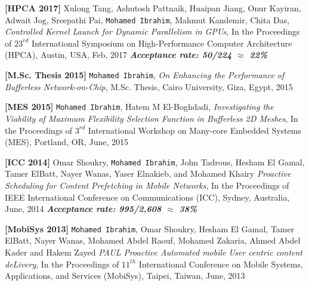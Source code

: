\documentclass[10pt,a4]{article}
\begin{document}

\begin{description}
\item 
{\bf [HPCA 2017]}
Xulong Tang, Ashutosh Pattnaik, Huaipan Jiang, Onur Kayiran, Adwait Jog, Sreepathi Pai, {\tt Mohamed Ibrahim}, Mahmut Kandemir, Chita Das, 
{\it Controlled Kernel Launch for Dynamic Parallelism in GPUs},
In the Proceedings of $23^{rd}$ International Symposium on High-Performance Computer Architecture (HPCA), 
Austin, USA, Feb, 2017
\textbf{\textit{Acceptance rate: 50/224 $\approx$ 22\%}}

\item 
{\bf [M.Sc. Thesis 2015]}
{\tt Mohamed Ibrahim}, {\it On Enhancing the Performance of Bufferless Network-on-Chip}, 
M.Sc. Thesis, Cairo University, Giza, Egypt, 2015

\item 
{\bf [MES 2015]}
{\tt Mohamed Ibrahim}, Hatem M El-Boghdadi,
{\it Investigating the Viability of Maximum Flexibility Selection Function in Bufferless 2D Meshes},
In the Proceedings of $3^{rd}$ International Workshop on Many-core Embedded Systems (MES), Portland, OR, June, 2015

\item{\bf [ICC 2014]} 
Omar Shoukry, {\tt Mohamed Ibrahim}, John Tadrous, Hesham El Gamal, Tamer ElBatt, Nayer Wanas, Yaser Elnakieb, and Mohamed Khairy 
{\it Proactive Scheduling for Content Pre­fetching in Mobile Networks}, 
In the Proceedings of IEEE International Conference on Communications (ICC), Sydney, Australia, June, 2014
\textbf{\textit{Acceptance rate: 995/2,608 $\approx$ 38\%}} 

\item{\bf [MobiSys 2013]} 
{\tt Mohamed Ibrahim}, Omar Shoukry, Hesham El Gamal, Tamer ElBatt, Nayer Wanas, Mohamed Abdel Raouf, Mohamed Zakaria, Ahmed Abdel Kader and Hakem Zayed 
{\it PAUL­ Proactive Automated mobile User centric content deLivery}, 
In the Proceedings of $11^{th}$ International Conference on Mobile Systems, Applications, and Services (MobiSys), Taipei, Taiwan, June, 2013

\end{description}

\end{document}
